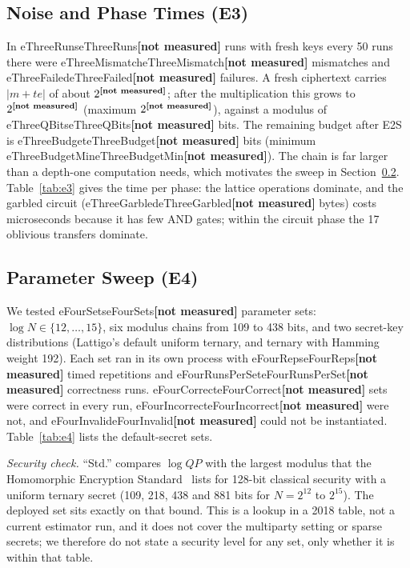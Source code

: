 \documentclass[conference,letterpaper]{IEEEtran}
\newcommand{\num}[1]{\ifcsname #1\endcsname\csname #1\endcsname\else\textbf{[not measured]}\fi}
\newcommand{\tabin}[1]{\IfFileExists{generated/#1}{\resizebox{\ifdim\width>\columnwidth\columnwidth\else\width\fi}{!}{}}{\textbf{[not measured]}}}
\begin{document}
\subsection{Noise and Phase Times (E3)}
In \num{eThreeRuns} runs with fresh keys every 50 runs there were \num{eThreeMismatch} mismatches and \num{eThreeFailed} failures. A fresh ciphertext carries $|m + te|$ of about $2^{\num{eThreeFresh}}$; after the multiplication this grows to $2^{\num{eThreeDelta}}$ (maximum $2^{\num{eThreeDeltaMax}}$), against a modulus of \num{eThreeQBits} bits. The remaining budget after E2S is \num{eThreeBudget} bits (minimum \num{eThreeBudgetMin}). The chain is far larger than a depth-one computation needs, which motivates the sweep in Section~\ref{sec:e4}. Table~\ref{tab:e3} gives the time per phase: the lattice operations dominate, and the garbled circuit (\num{eThreeGarbled} bytes) costs microseconds because it has few AND gates; within the circuit phase the 17 oblivious transfers dominate.

\begin{table}[t]
\caption{Native time per phase in ms, deployed parameters (E3, both parties' work summed where applicable).}
\label{tab:e3}
\centering\scriptsize
\tabin{tab_e3.tex}
\end{table}

\subsection{Parameter Sweep (E4)}
\label{sec:e4}
We tested \num{eFourSets} parameter sets: $\log N \in \{12,\dots,15\}$, six modulus chains from 109 to 438 bits, and two secret-key distributions (Lattigo's default uniform ternary, and ternary with Hamming weight 192). Each set ran in its own process with \num{eFourReps} timed repetitions and \num{eFourRunsPerSet} correctness runs. \num{eFourCorrect} sets were correct in every run, \num{eFourIncorrect} were not, and \num{eFourInvalid} could not be instantiated. Table~\ref{tab:e4} lists the default-secret sets.

\emph{Security check.} ``Std.'' compares $\log QP$ with the largest modulus that the Homomorphic Encryption Standard~\cite{hestd} lists for 128-bit classical security with a uniform ternary secret (109, 218, 438 and 881 bits for $N = 2^{12}$ to $2^{15}$). The deployed set sits exactly on that bound. This is a lookup in a 2018 table, not a current estimator run, and it does not cover the multiparty setting or sparse secrets; we therefore do not state a security level for any set, only whether it is within that table.
\end{document}
